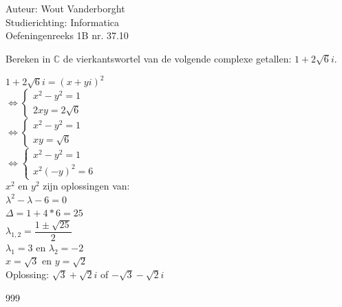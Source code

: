 \documentclass[a4paper]{article}
\begin{document}
  
\noindent \large Auteur: Wout Vanderborght\\
\noindent \large Studierichting: Informatica\\
\noindent \large Oefeningenreeks 1B nr. 37.10\\

\medskip

\normalsize

Bereken in $\mathbb{C}$ de vierkantswortel van de volgende complexe getallen: $ 1 + 2\sqrt{6}i $.

$ 1 + 2\sqrt{6}i = (x + yi)^2 $\\

$\Leftrightarrow \left \{
\begin{array}{l}
    x^2 - y^2 = 1 \\
    2xy = 2\sqrt{6}
\end{array}
\right .$\\

$\Leftrightarrow \left \{
\begin{array}{l}
    x^2 - y^2 = 1 \\
    xy = \sqrt{6}
\end{array}
\right .$\\

$\Leftrightarrow \left \{
\begin{array}{l}
    x^2 - y^2 = 1 \\
    x^2(-y)^2 = 6
\end{array}
\right .$\\

$x^2$ en $y^2$ zijn oplossingen van:\\

$ \lambda^2 - \lambda - 6 = 0 $\\

$ \Delta = 1 + 4 * 6 = 25 $\\

$ \lambda_{1,2} = \dfrac{1 \pm \sqrt{25}}{2} $\\

$ \lambda_1 = 3 $ en $ \lambda_2 = -2 $\\

$ x = \sqrt{3} $ en $ y = \sqrt{2} $\\

Oplossing: $ \sqrt{3} + \sqrt{2}i $ of $ -\sqrt{3} - \sqrt{2}i $

\begin{thebibliography}{999}
\end{thebibliography}
\end{document}
